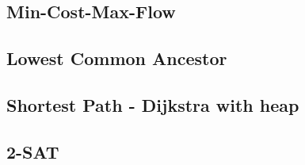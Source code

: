 \subsection{Min-Cost-Max-Flow}



\subsection{Lowest Common Ancestor}



\subsection{Shortest Path - Dijkstra with heap}



\subsection{2-SAT}


